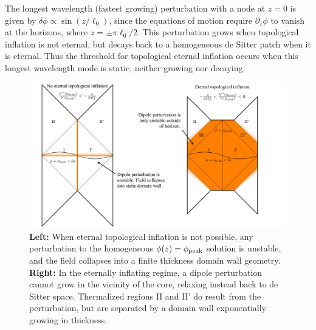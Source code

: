 \documentclass[aps,amsfonts,amsmath,prd,preprint,nofootinbib]{revtex4}
\begin{document}
\begin{appendix}
The longest wavelength (fastest growing) perturbation with a
node at $z=0$ is given by $\delta\phi \propto \sin(z/\ell_0)$, since the equations of motion require $\partial_z\phi$ to vanish at the horizons, where $z = \pm \pi \ell_0/2$.
This perturbation grows when topological inflation is not eternal, but decays back to a homogeneous de Sitter patch when it is eternal.
Thus the threshold for topological eternal inflation occurs when this longest wavelength mode is static, neither growing nor decaying.


\begin{figure}[htbp]
\begin{center}
\includegraphics[width=1\textwidth]{figures/TEI}
\caption{{\bf Left:} When eternal topological inflation is not possible, any perturbation to the homogeneous $\phi(z) = \phi_{\rm peak}$ solution is unstable, and the field collapses into a finite thickness domain wall geometry.
{\bf Right:}  In the eternally inflating regime, a dipole perturbation cannot grow in the vicinity of the core, relaxing instead back to de Sitter space.  Thermalized regions II and II' do result from the perturbation, but are separated by a domain wall exponentially growing in thickness.}
\label{fig:TEI}
\end{center}
\end{figure}





\end{appendix}
\end{document}
